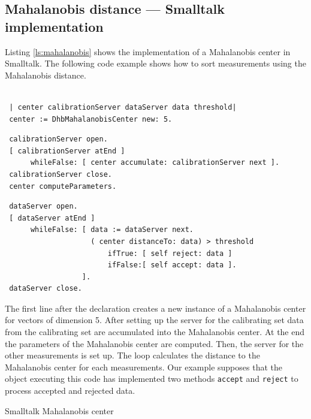 \documentclass[twoside]{book}
\begin{document}
\subsection{Mahalanobis distance --- Smalltalk implementation}
Listing \ref{ls:mahalanobis} shows the implementation of a
Mahalanobis center in Smalltalk. The following code example shows
how to sort measurements using the Mahalanobis distance.
\begin{codeExample}
\begin{verbatim}

 | center calibrationServer dataServer data threshold|
 center := DhbMahalanobisCenter new: 5.
\end{verbatim}
\begin{verbatim}
 calibrationServer open.
 [ calibrationServer atEnd ]
      whileFalse: [ center accumulate: calibrationServer next ].
 calibrationServer close.
 center computeParameters.
\end{verbatim}
\begin{verbatim}
 dataServer open.
 [ dataServer atEnd ]
      whileFalse: [ data := dataServer next.
                    ( center distanceTo: data) > threshold
                        ifTrue: [ self reject: data ]
                        ifFalse:[ self accept: data ].
                  ].
 dataServer close.
\end{verbatim}
\end{codeExample}
The first line after the declaration creates a new instance of a
Mahalanobis center for vectors of dimension 5. After setting up
the server for the calibrating set data from the calibrating set
are accumulated into the Mahalanobis center. At the end the
parameters of the Mahalanobis center are computed. Then, the
server for the other measurements is set up. The loop calculates
the distance to the Mahalanobis center for each measurements. Our
example supposes that the object executing this code has
implemented two methods {\tt accept} and {\tt reject} to process
accepted and rejected data.

\begin{listing} Smalltalk Mahalanobis center  \label{ls:mahalanobis}

\end{listing}
\end{document}
